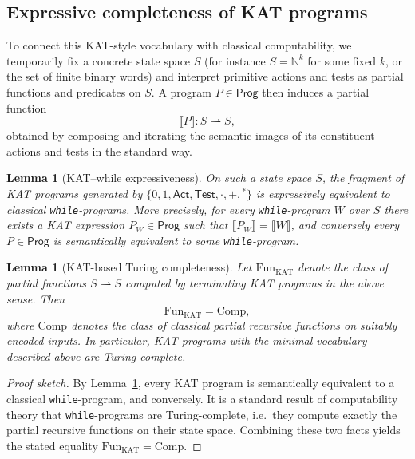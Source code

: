 \documentclass[11pt]{book}
\theoremstyle{plain}
\newtheorem{lemma}[theorem]{Lemma}
\theoremstyle{definition}
\theoremstyle{remark}
\begin{document}
\subsection*{Expressive completeness of KAT programs}

To connect this KAT-style vocabulary with classical computability, we
temporarily fix a concrete state space $S$ (for instance $S =
\mathbb{N}^k$ for some fixed $k$, or the set of finite binary words) and
interpret primitive actions and tests as partial functions and
predicates on $S$. A program $P\in\mathsf{Prog}$ then induces a partial
function
\[
  \llbracket P\rrbracket : S \rightharpoonup S,
\]
obtained by composing and iterating the semantic images of its
constituent actions and tests in the standard way.

\begin{lemma}[KAT--while expressiveness]\label{lem:KAT-while-equivalence}
On such a state space $S$, the fragment of KAT programs generated by
$\{0,1,\mathsf{Act},\mathsf{Test},\cdot,+,{}^\ast\}$ is expressively
equivalent to classical \texttt{while}-programs. More precisely, for
every \texttt{while}-program $W$ over $S$ there exists a KAT expression
$P_W\in\mathsf{Prog}$ such that $\llbracket P_W\rrbracket =
\llbracket W\rrbracket$, and conversely every $P\in\mathsf{Prog}$ is
semantically equivalent to some \texttt{while}-program.
\end{lemma}



\begin{lemma}[KAT-based Turing completeness]\label{lem:KAT-Turing-completeness}
Let $\mathrm{Fun}_{\mathrm{KAT}}$ denote the class of partial functions
$S\rightharpoonup S$ computed by terminating KAT programs in the above
sense. Then
\[
  \mathrm{Fun}_{\mathrm{KAT}} = \mathrm{Comp},
\]
where $\mathrm{Comp}$ denotes the class of classical partial recursive
functions on suitably encoded inputs. In particular, KAT programs with
the minimal vocabulary described above are Turing-complete.
\end{lemma}

\begin{proof}[Proof sketch]
By Lemma~\ref{lem:KAT-while-equivalence}, every KAT program is
semantically equivalent to a classical \texttt{while}-program, and
conversely. It is a standard result of computability theory that
\texttt{while}-programs are Turing-complete, i.e.\ they compute exactly
the partial recursive functions on their state space. Combining these
two facts yields the stated equality
$\mathrm{Fun}_{\mathrm{KAT}} = \mathrm{Comp}$.
\end{proof}
\end{document}
